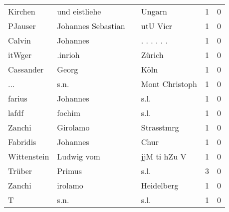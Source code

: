 \documentclass[10pt,a4paper,landscape]{article}
\begin{document}
\begin{longtable}{llllrr}
                  Kirchen &                      und eistliehe &             &                                      Ungarn &          1 &         0 \\
                  PJauser &                 Johannes Sebastian &             &                                    utU Vicr &          1 &         0 \\
                   Calvin &                           Johannes &             &                                . . . . . .  &          1 &         0 \\
                   itWger &                            .inrioh &             &                                      Zürich &          1 &         0 \\
                Cassander &                              Georg &             &                                        Köln &          1 &         0 \\
                      ... &                               s.n. &             &                              Mont Christoph &          1 &         0 \\
                   farius &                           Johannes &             &                                        s.l. &          1 &         0 \\
                    lafdf &                             fochim &             &                                        s.l. &          1 &         0 \\
                   Zanchi &                           Girolamo &             &                                  Strasstmrg &          1 &         0 \\
                 Fabridis &                           Johannes &             &                                        Chur &          1 &         0 \\
              Wittenstein &                         Ludwig vom &             &                                jjM ti hZu V &          1 &         0 \\
                   Trüber &                             Primus &             &                                        s.l. &          3 &         0 \\
                   Zanchi &                            irolamo &             &                                  Heidelberg &          1 &         0 \\
                        T &                               s.n. &             &                                        s.l. &          1 &         0 \\

\end{longtable}
\end{document}
